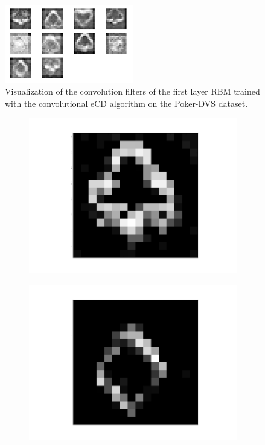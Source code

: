 \begin{figure}[h!]
	\centering
    	\includegraphics[width=0.5\textwidth]{imgs/poker/w2.png} 
    \caption{Visualization of the convolution filters of the first layer RBM trained with the convolutional eCD algorithm on the Poker-DVS dataset.}
	\label{fig:pokerw}
\end{figure}


\begin{figure}[h!]
	\centering
	\begin{subfigure}{.25\textwidth}
  		\centering
  		\includegraphics[width=.8\linewidth]{imgs/poker/recon_img5.png}
  		\label{fig:sub1}
	\end{subfigure}%
	\begin{subfigure}{.25\textwidth}
  		\centering
  		\includegraphics[width=.8\linewidth]{imgs/poker/recon_img3.png}

\end{subfigure}
\end{figure}

